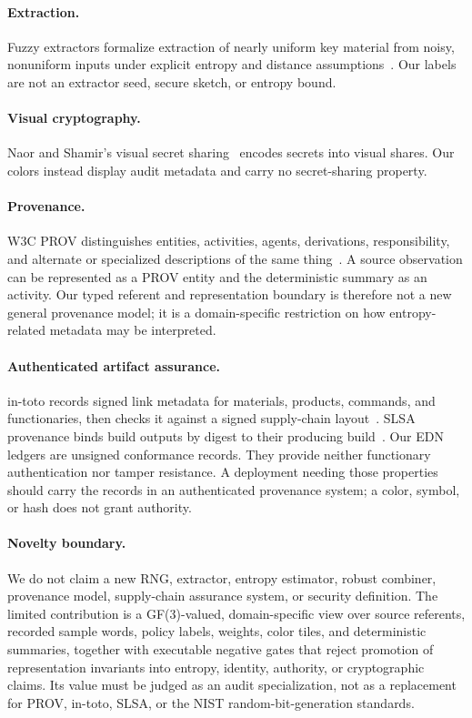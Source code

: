 \documentclass[preprint,nohyperxmp]{iacrtrans}
\begin{document}
\paragraph{Extraction.} Fuzzy extractors formalize extraction of nearly
uniform key material from noisy, nonuniform inputs under explicit entropy and
distance assumptions~\cite{dodis2004extractors}. Our labels are not an
extractor seed, secure sketch, or entropy bound.

\paragraph{Visual cryptography.} Naor and Shamir's visual secret
sharing~\cite{naor1995visual} encodes secrets into visual shares. Our colors
instead display audit metadata and carry no secret-sharing property.

\paragraph{Provenance.} W3C PROV distinguishes entities, activities, agents,
derivations, responsibility, and alternate or specialized descriptions of the
same thing~\cite{w3cprov}. A source observation can be represented as a PROV
entity and the deterministic summary as an activity. Our typed referent and
representation boundary is therefore not a new general provenance model; it
is a domain-specific restriction on how entropy-related metadata may be
interpreted.

\paragraph{Authenticated artifact assurance.} in-toto records signed link
metadata for materials, products, commands, and functionaries, then checks it
against a signed supply-chain layout~\cite{intoto2019}. SLSA provenance binds
build outputs by digest to their producing build~\cite{slsa11}. Our EDN
ledgers are unsigned conformance records. They provide neither functionary
authentication nor tamper resistance. A deployment needing those properties
should carry the records in an authenticated provenance system; a color,
symbol, or hash does not grant authority.

\paragraph{Novelty boundary.} We do not claim a new RNG, extractor, entropy
estimator, robust combiner, provenance model, supply-chain assurance system,
or security definition. The limited contribution is a GF(3)-valued,
domain-specific view over source referents, recorded sample words, policy
labels, weights, color tiles, and deterministic summaries, together with
executable negative gates that reject promotion of representation invariants
into entropy, identity, authority, or cryptographic claims. Its value must be
judged as an audit specialization, not as a replacement for PROV, in-toto,
SLSA, or the NIST random-bit-generation standards.
\end{document}
